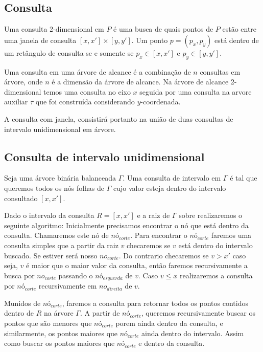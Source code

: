 \subsection{Consulta}

Uma consulta 2-dimensional em $P$ é uma busca de quais pontos de $P$ estão entre uma janela de consulta
$[x, x'] \times [y, y']$. Um ponto $p = (p_x, p_y)$ está dentro de um retângulo de consulta se e somente
se $p_x \in [x, x']$ e $p_y \in [y, y']$. \cite{cg_rt1}

Uma consulta em uma árvore de alcance é a combinação de $n$ consultas em árvore, onde $n$ é a dimensão
da árvore de alcance.
Na árvore de alcance 2-dimensional temos uma consulta no eixo $x$ seguida por uma consulta na arvore 
auxiliar $\tau$ que foi construída considerando $y$-coordenada.

A consulta com janela, consistirá portanto na união de duas consultas de intervalo unidimensional em
árvore.

\subsection{Consulta de intervalo unidimensional}

Seja uma árvore binária balanceada $\Gamma$. Uma consulta de intervalo em $\Gamma$ é tal que queremos
todos os nós folhas de $\Gamma$ cujo valor esteja dentro do intervalo consultado $[x, x']$.

Dado o intervalo da consulta $R = [x , x']$ e a raiz de $\Gamma$ sobre realizaremos o seguinte algoritmo:
Inicialmente precisamos encontrar o nó que está dentro da consulta. Chamaremos este nó de $nó_{corte}$.
Para encontrar o $nó_{corte}$ faremos uma consulta simples que a partir da raiz $v$ checaremos se $v$
está dentro do intervalo buscado. Se estiver será nosso $no_{corte}$. Do contrario checaremos se $v > x'$
caso seja, $v$ é maior que o maior valor da consulta, então faremos recursivamente a busca por $no_{corte}$
passando o $nó_{esquerda}$ de $v$. Caso $v \leq x$ realizaremos a consulta por $nó_{corte}$ recursivamente
em $no_{direita}$ de $v$.

Munidos de $nó_{corte}$, faremos a consulta para retornar todos os pontos contidos dentro de $R$ na árvore
$\Gamma$.
A partir de $nó_{corte}$, queremos recursivamente buscar os pontos que são menores que $nó_{corte}$ porem
ainda dentro da consulta, e similarmente, os pontos maiores que $nó_{corte}$ ainda dentro do intervalo.
Assim como buscar os pontos maiores que $nó_{corte}$ e dentro da consulta. \cite{cg_search1}


